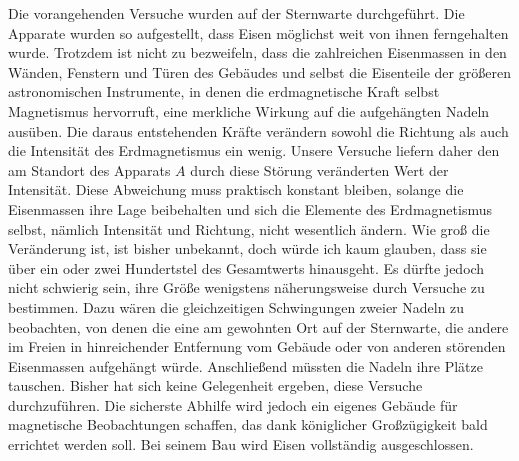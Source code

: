 Die vorangehenden Versuche wurden auf der Sternwarte durchgeführt. Die Apparate wurden so aufgestellt, dass Eisen möglichst weit von ihnen ferngehalten wurde. Trotzdem ist nicht zu bezweifeln, dass die zahlreichen Eisenmassen in den Wänden, Fenstern und Türen des Gebäudes und selbst die Eisenteile der größeren astronomischen Instrumente, in denen die erdmagnetische Kraft selbst Magnetismus hervorruft, eine merkliche Wirkung auf die aufgehängten Nadeln ausüben. Die daraus entstehenden Kräfte verändern sowohl die Richtung als auch die Intensität des Erdmagnetismus ein wenig. Unsere Versuche liefern daher den am Standort des Apparats $A$ durch diese Störung veränderten Wert der Intensität. Diese Abweichung muss praktisch konstant bleiben, solange die Eisenmassen ihre Lage beibehalten und sich die Elemente des Erdmagnetismus selbst, nämlich Intensität und Richtung, nicht wesentlich ändern. Wie groß die Veränderung ist, ist bisher unbekannt, doch würde ich kaum glauben, dass sie über ein oder zwei Hundertstel des Gesamtwerts hinausgeht. Es dürfte jedoch nicht schwierig sein, ihre Größe wenigstens näherungsweise durch Versuche zu bestimmen. Dazu wären die gleichzeitigen Schwingungen zweier Nadeln zu beobachten, von denen die eine am gewohnten Ort auf der Sternwarte, die andere im Freien in hinreichender Entfernung vom Gebäude oder von anderen störenden Eisenmassen aufgehängt würde. Anschließend müssten die Nadeln ihre Plätze tauschen. Bisher hat sich keine Gelegenheit ergeben, diese Versuche durchzuführen. Die sicherste Abhilfe wird jedoch ein eigenes Gebäude für magnetische Beobachtungen schaffen, das dank königlicher Großzügigkeit bald errichtet werden soll. Bei seinem Bau wird Eisen vollständig ausgeschlossen.

